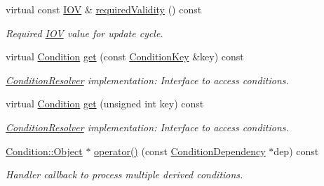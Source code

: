 \begin{DoxyCompactItemize}
virtual const \hyperlink{class_d_d4hep_1_1_i_o_v}{IOV} \& \hyperlink{class_d_d4hep_1_1_conditions_1_1_conditions_dependency_handler_a402d7a0ab3c92562382b8595205efd86}{requiredValidity} () const 
\begin{DoxyCompactList}\small\item\em Required \hyperlink{class_d_d4hep_1_1_i_o_v}{IOV} value for update cycle. \item\end{DoxyCompactList}\item 
virtual \hyperlink{class_d_d4hep_1_1_conditions_1_1_condition}{Condition} \hyperlink{class_d_d4hep_1_1_conditions_1_1_conditions_dependency_handler_a76eb4e4234146f775b4c32396acad7f8}{get} (const \hyperlink{class_d_d4hep_1_1_conditions_1_1_condition_key}{ConditionKey} \&key) const 
\begin{DoxyCompactList}\small\item\em \hyperlink{class_d_d4hep_1_1_conditions_1_1_condition_resolver}{ConditionResolver} implementation: Interface to access conditions. \item\end{DoxyCompactList}\item 
virtual \hyperlink{class_d_d4hep_1_1_conditions_1_1_condition}{Condition} \hyperlink{class_d_d4hep_1_1_conditions_1_1_conditions_dependency_handler_aff162f6a84d33587bce982b60b259d14}{get} (unsigned int key) const 
\begin{DoxyCompactList}\small\item\em \hyperlink{class_d_d4hep_1_1_conditions_1_1_condition_resolver}{ConditionResolver} implementation: Interface to access conditions. \item\end{DoxyCompactList}\item 
\hyperlink{class_d_d4hep_1_1_conditions_1_1_interna_1_1_condition_object}{Condition::Object} $\ast$ \hyperlink{class_d_d4hep_1_1_conditions_1_1_conditions_dependency_handler_aed5f26afb531cb8f036efccfc9deeed1}{operator()} (const \hyperlink{class_d_d4hep_1_1_conditions_1_1_condition_dependency}{ConditionDependency} $\ast$dep) const 
\begin{DoxyCompactList}\small\item\em Handler callback to process multiple derived conditions. \item\end{DoxyCompactList}\end{DoxyCompactItemize}
